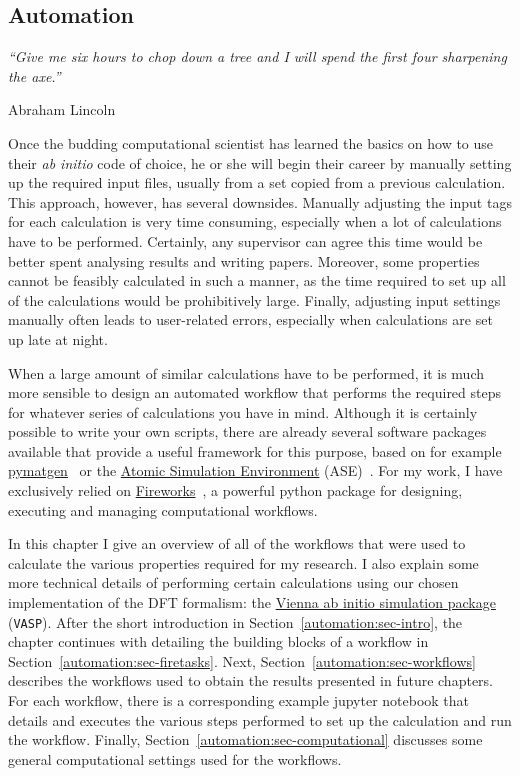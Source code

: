\begin{refsection} 
 
\chapter{Automation} 
 
\setlength{\epigraphwidth}{3in} 
\epigraph{\textit{``Give me six hours to chop down a tree and I will spend the 
first four sharpening the axe.''}}{Abraham Lincoln} 
\vspace{3em} 
 
Once the budding computational scientist has learned the basics on how to use 
their \textit{ab initio} code of choice, he or she will begin their career by 
manually setting up the required input files, usually from a set copied from a 
previous calculation. This approach, however, has several downsides. Manually 
adjusting the input tags for each calculation is very time consuming, 
especially when a lot of calculations have to be performed. Certainly, any 
supervisor can agree this time would be better spent analysing results and 
writing papers. Moreover, some properties cannot be feasibly calculated in 
such a manner, as the time required to set up all of the calculations would be 
prohibitively large. Finally, adjusting input settings manually often leads to 
user-related errors, especially when calculations are set up late at night.  

When a large amount of similar calculations have to be performed, it is much 
more sensible to design an automated workflow that performs the required steps 
for whatever series of calculations you have in mind. Although it is certainly 
possible to write your own scripts, there are already several software 
packages available that provide a useful framework for this purpose, based on 
for example \href{http://pymatgen.org/}{pymatgen}~\cite{Ong2013} or the 
\href{https://wiki.fysik.dtu.dk/ase/}{Atomic Simulation Environment} 
(ASE)~\cite{Larsen2017}. For my work, I have exclusively relied on 
\href{https://materialsproject.github.io/fireworks/index.html}{Fireworks}~\cite{Jain2015}, 
a powerful python package for designing, executing and managing computational 
workflows. 
 
In this chapter I give an overview of all of the workflows that were used to 
calculate the various properties required for my research. I also explain some 
more technical details of performing certain calculations using our chosen 
implementation of the DFT formalism: the \href{https://www.vasp.at/}{Vienna ab 
initio simulation package} (\texttt{VASP}). After the short introduction in 
Section~\ref{automation:sec-intro}, the chapter continues with detailing the 
building blocks of a workflow in Section~\ref{automation:sec-firetasks}. Next, 
Section~\ref{automation:sec-workflows} describes the workflows used to obtain 
the results presented in future chapters. For each workflow, there is a 
corresponding example jupyter notebook that details and executes the various 
steps performed to set up the calculation and run the workflow. Finally, 
Section~\ref{automation:sec-computational} discusses some general 
computational settings used for the workflows. 
 

\end{refsection}
